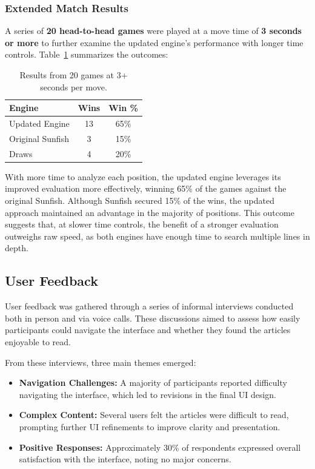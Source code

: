 \documentclass[12pt,a4paper]{article}
\begin{document}
\subsubsection{Extended Match Results}

A series of \textbf{20 head-to-head games} were played at a move time of \textbf{3 seconds or more} to further examine the updated engine’s performance with longer time controls. Table~\ref{tab:extended_results} summarizes the outcomes:

\begin{table}[ht]
\centering
\begin{tabular}{lcc}
\hline
\textbf{Engine} & \textbf{Wins} & \textbf{Win \%} \\
\hline
Updated Engine   & 13 & 65\% \\
Original Sunfish & 3  & 15\% \\
Draws            & 4  & 20\% \\
\hline
\end{tabular}
\caption{Results from 20 games at 3+ seconds per move.}
\label{tab:extended_results}
\end{table}

With more time to analyze each position, the updated engine leverages its improved evaluation more effectively, winning 65\% of the games against the original Sunfish. Although Sunfish secured 15\% of the wins, the updated approach maintained an advantage in the majority of positions. This outcome suggests that, at slower time controls, the benefit of a stronger evaluation outweighs raw speed, as both engines have enough time to search multiple lines in depth.
\FloatBarrier

\subsection{User Feedback}

User feedback was gathered through a series of informal interviews conducted both in person and via voice calls. These discussions aimed to assess how easily participants could navigate the interface and whether they found the articles enjoyable to read.

From these interviews, three main themes emerged:
\begin{itemize}
    \item \textbf{Navigation Challenges:} A majority of participants reported difficulty navigating the interface, which led to revisions in the final UI design.
    \item \textbf{Complex Content:} Several users felt the articles were difficult to read, prompting further UI refinements to improve clarity and presentation.
    \item \textbf{Positive Responses:} Approximately 30\% of respondents expressed overall satisfaction with the interface, noting no major concerns.
\end{itemize}
\end{document}
